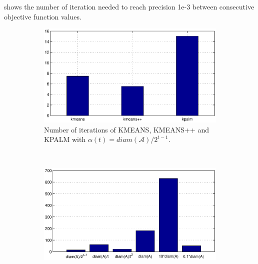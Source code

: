 \documentclass[11pt]{article}
\numberwithin{equation}{section}
\begin{document}

 shows the number of iteration needed to reach precision 1e-3 between consecutive objective function values.

\begin{figure}[ht]
    \centering
    \begin{subfigure}[b]{0.8\textwidth}
        \includegraphics[width=\textwidth]{iterations_algs_comparison}
        \caption{Number of iterations of KMEANS, KMEANS++ and KPALM with $\alpha(t)=diam(\mathcal{A})/2^{t-1}$.}
        \label{fig:iters_algs_comp}
    \end{subfigure}
    ~ %
    \begin{subfigure}[b]{0.8\textwidth}
        \includegraphics[width=\textwidth]{iterations_dynamic_alpha_kpalm_comparison}

\end{subfigure}
\end{figure}
\end{document}
